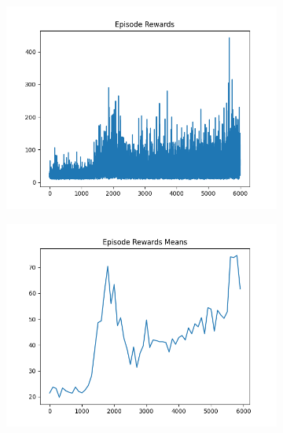 \begin{figure}[H]
\begin{subfigure}{.47\linewidth}
        \includegraphics[width=\textwidth]{pole/2024-06-14_18-17-10_dqn_cartpole_episode_rewards.png}
    \end{subfigure}
    \begin{subfigure}{.47\linewidth}
        \centering
        \includegraphics[width=\textwidth]{pole/2024-06-14_18-17-10_dqn_cartpole_episode_rewards_means.png}
    \end{subfigure}
\end{figure}
